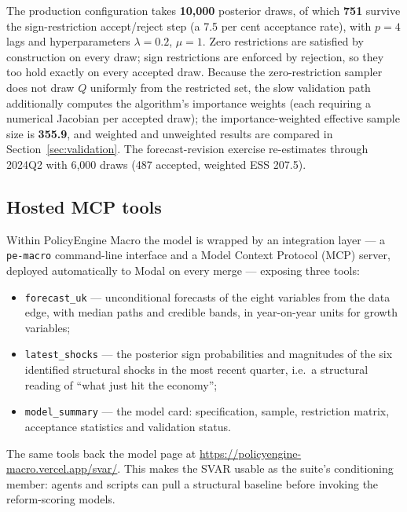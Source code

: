 The production configuration takes \textbf{10{,}000} posterior draws, of which \textbf{751} survive the sign-restriction accept/reject step (a 7.5 per cent acceptance rate), with $p=4$ lags and hyperparameters $\lambda = 0.2$, $\mu = 1$. Zero restrictions are satisfied by construction on every draw; sign restrictions are enforced by rejection, so they too hold exactly on every accepted draw. Because the \citet{arias2018} zero-restriction sampler does not draw $Q$ uniformly from the restricted set, the slow validation path additionally computes the algorithm's importance weights (each requiring a numerical Jacobian per accepted draw); the importance-weighted effective sample size is \textbf{355.9}, and weighted and unweighted results are compared in Section~\ref{sec:validation}. The forecast-revision exercise re-estimates through 2024Q2 with 6{,}000 draws (487 accepted, weighted ESS 207.5).

\subsection{Hosted MCP tools}

Within PolicyEngine Macro the model is wrapped by an integration layer --- a \texttt{pe-macro} command-line interface and a Model Context Protocol (MCP) server, deployed automatically to Modal on every merge --- exposing three tools:

\begin{itemize}
\item \texttt{forecast\_uk} --- unconditional forecasts of the eight variables from the data edge, with median paths and credible bands, in year-on-year units for growth variables;
\item \texttt{latest\_shocks} --- the posterior sign probabilities and magnitudes of the six identified structural shocks in the most recent quarter, i.e.\ a structural reading of ``what just hit the economy'';
\item \texttt{model\_summary} --- the model card: specification, sample, restriction matrix, acceptance statistics and validation status.
\end{itemize}

\noindent The same tools back the model page at \url{https://policyengine-macro.vercel.app/svar/}. This makes the SVAR usable as the suite's conditioning member: agents and scripts can pull a structural baseline before invoking the reform-scoring models.
